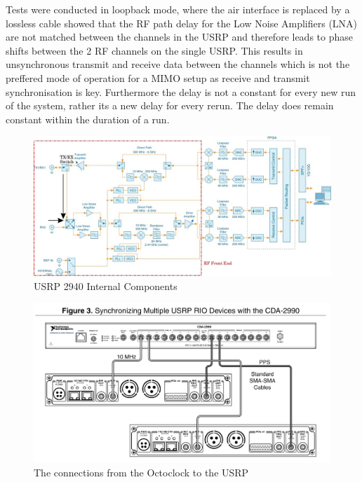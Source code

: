 Tests were conducted in loopback mode, where the air interface is replaced by a lossless cable showed that the RF path delay for the Low Noise Amplifiers (LNA) are not matched between the channels in the USRP and therefore leads to phase shifts between the 2 RF channels on the single USRP. This results in unsynchronous transmit and receive data between the channels which is not the preffered mode of operation for a MIMO setup as receive and transmit synchronisation is key. Furthermore the delay is not a constant for every new run of the system, rather its a new delay for every rerun. The delay does remain constant within the duration of a run.

\begin{landscape}%
    \begin{figure}[H]
        \centering
        \includegraphics[width=\linewidth]{images/USRPInternalsEdited.jpeg}
        \caption{USRP 2940 Internal Components}%
        \label{fig:USRPInternals}%
    \end{figure}
\end{landscape}

\begin{figure}[H]
    \centering
    \includegraphics[width=\linewidth]{images/USRPHWConnections.png}
    \caption{The connections from the Octoclock to the USRP}
    \label{fig:OctoUSRPConnections}%
\end{figure}


